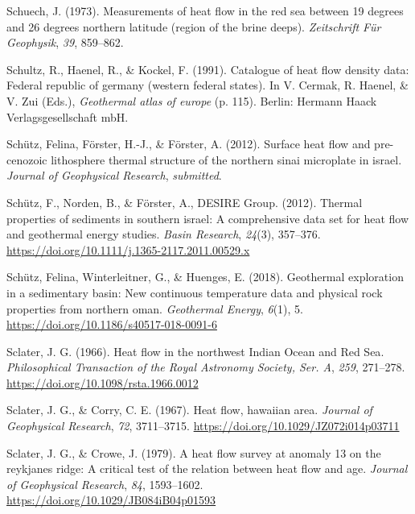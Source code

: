 \documentclass[draft,linenumbers]{agujournal2018}
\begin{document}
\leavevmode{}%
Schuech, J. (1973). Measurements of heat flow in the red sea between 19
degrees and 26 degrees northern latitude (region of the brine deeps).
\emph{Zeitschrift Für Geophysik}, \emph{39}, 859--862.

\leavevmode{}%
Schultz, R., Haenel, R., \& Kockel, F. (1991). Catalogue of heat flow
density data: Federal republic of germany (western federal states). In
V. Cermak, R. Haenel, \& V. Zui (Eds.), \emph{Geothermal atlas of
europe} (p. 115). Berlin: Hermann Haack Verlagsgesellschaft mbH.

\leavevmode{}%
Schütz, Felina, Förster, H.-J., \& Förster, A. (2012). Surface heat flow
and pre-cenozoic lithosphere thermal structure of the northern sinai
microplate in israel. \emph{Journal of Geophysical Research},
\emph{submitted}.

\leavevmode{}%
Schütz, F., Norden, B., \& Förster, A., DESIRE Group. (2012). Thermal
properties of sediments in southern israel: A comprehensive data set for
heat flow and geothermal energy studies. \emph{Basin Research},
\emph{24}(3), 357--376.
\url{https://doi.org/10.1111/j.1365-2117.2011.00529.x}

\leavevmode{}%
Schütz, Felina, Winterleitner, G., \& Huenges, E. (2018). Geothermal
exploration in a sedimentary basin: New continuous temperature data and
physical rock properties from northern oman. \emph{Geothermal Energy},
\emph{6}(1), 5. \url{https://doi.org/10.1186/s40517-018-0091-6}

\leavevmode{}%
Sclater, J. G. (1966). Heat flow in the northwest {Indian Ocean and Red
Sea}. \emph{Philosophical Transaction of the Royal Astronomy Society,
Ser. A}, \emph{259}, 271--278.
\url{https://doi.org/10.1098/rsta.1966.0012}

\leavevmode{}%
Sclater, J. G., \& Corry, C. E. (1967). Heat flow, hawaiian area.
\emph{Journal of Geophysical Research}, \emph{72}, 3711--3715.
\url{https://doi.org/10.1029/JZ072i014p03711}

\leavevmode{}%
Sclater, J. G., \& Crowe, J. (1979). A heat flow survey at anomaly 13 on
the reykjanes ridge: A critical test of the relation between heat flow
and age. \emph{Journal of Geophysical Research}, \emph{84}, 1593--1602.
\url{https://doi.org/10.1029/JB084iB04p01593}
\end{document}
